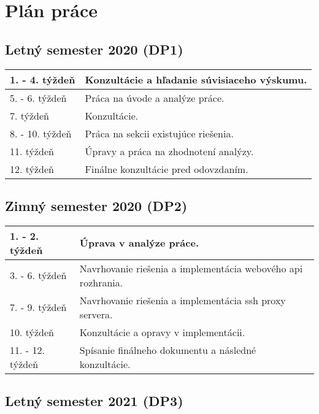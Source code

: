 \chapter{Plán práce}

\renewcommand*{\thepage}{A\arabic{page}}

\section{Letný semester 2020 (DP1)}

\begin{tabular}{|l||l|}
\hline
1. - 4. týždeň & Konzultácie a hľadanie súvisiaceho výskumu.  \\
\hline
5. - 6. týždeň & Práca na úvode a analýze práce.  \\
\hline
7. týždeň & Konzultácie.  \\
\hline
8. - 10. týždeň & Práca na sekcii existujúce riešenia.  \\
\hline
11. týždeň & Úpravy a práca na zhodnotení analýzy. \\
\hline
12. týždeň & Finálne konzultácie pred odovzdaním. \\
\hline
\end{tabular}

\vspace*{1 cm}

\section{Zimný semester 2020 (DP2)}

\begin{tabular}{|l||l|}
\hline
1. - 2. týždeň & Úprava v analýze práce. \\
\hline
3. - 6. týždeň & Navrhovanie riešenia a implementácia webového api rozhrania. \\
\hline
7. - 9. týždeň & Navrhovanie riešenia a implementácia ssh proxy servera. \\
\hline
10. týždeň & Konzultácie a opravy v implementácii. \\
\hline
11. - 12. týždeň & Spísanie finálneho dokumentu a následné konzultácie. \\
\hline
\end{tabular}

\vspace*{1 cm}

\section{Letný semester 2021 (DP3)}


